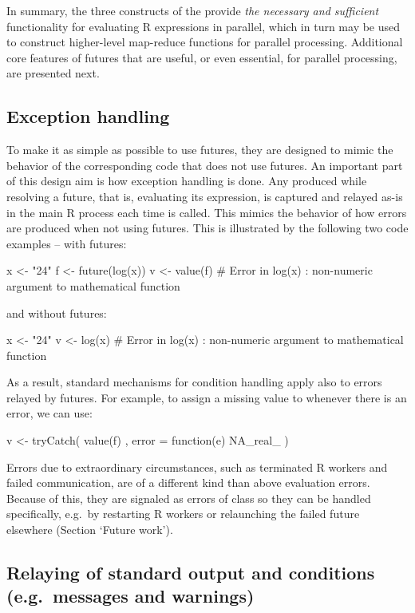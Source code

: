 In summary, the three constructs of the  provide
\emph{the necessary and sufficient} functionality for evaluating
R expressions in parallel, which in turn may be used to construct
higher-level map-reduce functions for parallel processing.  Additional
core features of futures that are useful, or even essential, for
parallel processing, are presented next.


\subsection{Exception handling}
\label{error-handling}

To make it as simple as possible to use futures, they are designed to
mimic the behavior of the corresponding code that does not use
futures.  An important part of this design aim is how exception
handling is done.  Any  produced while resolving a future,
that is, evaluating its expression, is captured and relayed as-is in
the main R process each time  is called.  This mimics
the behavior of how errors are produced when not using futures.  This
is illustrated by the following two code examples -- with futures:
\begin{example}
x <- "24"
f <- future(log(x))
v <- value(f)
# Error in log(x) : non-numeric argument to mathematical function
\end{example}
and without futures:
\begin{example}
x <- "24"
v <- log(x)
# Error in log(x) : non-numeric argument to mathematical function
\end{example}
As a result, standard mechanisms for condition handling apply also to
errors relayed by futures.  For example, to assign a missing value
to  whenever there is an error, we can use:
\begin{example}
v <- tryCatch({
  value(f)
}, error = function(e) {
  NA_real_
})
\end{example}

Errors due to extraordinary circumstances, such as terminated R
workers and failed communication, are of a different kind than above
evaluation errors.  Because of this, they are signaled as errors of
class  so they can be handled specifically, e.g.\ by
restarting R workers or relaunching the failed future elsewhere
(Section `Future work').


\subsection{Relaying of standard output and conditions (e.g.\ messages and warnings)}
\label{relaying-of-standard-output-and-conditions-e.g.messages-and-warnings}

